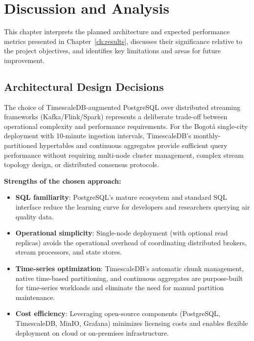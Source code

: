 \chapter{Discussion and Analysis}
\label{ch:evaluation}

This chapter interprets the planned architecture and expected performance metrics presented in Chapter~\ref{ch:results}, discusses their significance relative to the project objectives, and identifies key limitations and areas for future improvement.

\section{Architectural Design Decisions}
\label{sec:architecture_discussion}

The choice of TimescaleDB-augmented PostgreSQL over distributed streaming frameworks (Kafka/Flink/Spark) represents a deliberate trade-off between operational complexity and performance requirements. For the Bogotá single-city deployment with 10-minute ingestion intervals, TimescaleDB's monthly-partitioned hypertables and continuous aggregates provide sufficient query performance without requiring multi-node cluster management, complex stream topology design, or distributed consensus protocols.

\textbf{Strengths of the chosen approach:}
\begin{itemize}
    \item \textbf{SQL familiarity}: PostgreSQL's mature ecosystem and standard SQL interface reduce the learning curve for developers and researchers querying air quality data.
    \item \textbf{Operational simplicity}: Single-node deployment (with optional read replicas) avoids the operational overhead of coordinating distributed brokers, stream processors, and state stores.
    \item \textbf{Time-series optimization}: TimescaleDB's automatic chunk management, native time-based partitioning, and continuous aggregates are purpose-built for time-series workloads and eliminate the need for manual partition maintenance.
    \item \textbf{Cost efficiency}: Leveraging open-source components (PostgreSQL, TimescaleDB, MinIO, Grafana) minimizes licensing costs and enables flexible deployment on cloud or on-premises infrastructure.
\end{itemize}

